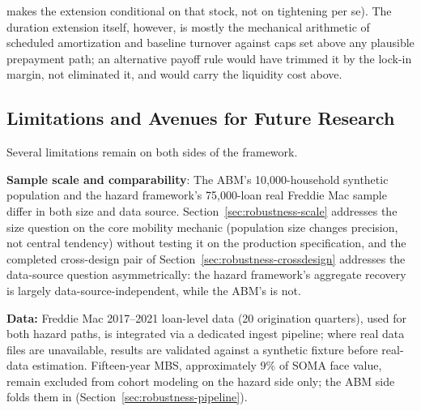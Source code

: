 \documentclass[12pt]{article}
\begin{document}
\citet{eichenbaum2022} makes the extension conditional on that stock, not on tightening per se). The duration extension itself, however, is mostly the mechanical arithmetic of scheduled amortization and baseline turnover against caps set above any plausible prepayment path; an alternative payoff rule would have trimmed it by the lock-in margin, not eliminated it, and would carry the liquidity cost above.

\subsection{Limitations and Avenues for Future Research}\label{sec:limitations}

Several limitations remain on both sides of the framework.

\textbf{Sample scale and comparability}: The ABM's 10,000-household synthetic population and the hazard framework's 75,000-loan real Freddie Mac sample differ in both size and data source. Section~\ref{sec:robustness-scale} addresses the size question on the core mobility mechanic (population size changes precision, not central tendency) without testing it on the production specification, and the completed cross-design pair of Section~\ref{sec:robustness-crossdesign} addresses the data-source question asymmetrically: the hazard framework's aggregate recovery is largely data-source-independent, while the ABM's is not.

\textbf{Data:} Freddie Mac 2017--2021 loan-level data (20 origination quarters), used for both hazard paths, is integrated via a dedicated ingest pipeline; where real data files are unavailable, results are validated against a synthetic fixture before real-data estimation. Fifteen-year MBS, approximately 9\% of SOMA face value, remain excluded from cohort modeling on the hazard side only; the ABM side folds them in (Section~\ref{sec:robustness-pipeline}).
\end{document}
